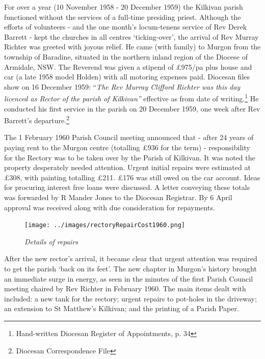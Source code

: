 For over a year (10 November 1958 - 20 December 1959) the Kilkivan parish functioned without the services of a full-time presiding priest. Although the efforts of volunteers - and the one month's locum-tenens service of Rev Derek Barrett - kept the churches in all centres `ticking-over', the arrival of Rev Murray Richter was greeted with joyous relief. He came (with family) to Murgon from the township of Baradine, situated in the northern inland region of the Diocese of Armidale, NSW. The Reverend was given a stipend of \pounds975/pa plus house and car (a late 1958 model Holden) with all motoring expenses paid. Diocesan files show on 16 December 1959: ``\emph{The Rev Murray Clifford Richter was this day licenced as Rector of the parish of Kilkivan''} effective as from date of writing.\footnote{Hand-written Diocesan Register of Appointments, p. 34} He conducted his first service in the parish on 20 December 1959, one week after Rev Barrett's departure.\footnote{Diocesan Correspondence File}


The 1 February 1960 Parish Council meeting announced that - after 24 years of paying rent to the Murgon centre (totalling \pounds936 for the term) - responsibility for the Rectory was to be taken over by the Parish of Kilkivan. It was noted the property desperately needed attention. Urgent initial repairs were estimated at \pounds308, with painting totalling \pounds211. \pounds176 was still owed on the car account. Ideas for procuring interest free loans were discussed. A letter conveying these totals was forwarded by R Mander Jones to the Diocesan Registrar. By 6 April approval was received along with due consideration for repayments.









\begin{figure}[!htb]
\begin{center}
\texttt{[image: ../images/rectoryRepairCost1960.png]}
\caption{\itshape Details of repairs}
\end{center}
\end{figure}




After the new rector's arrival, it became clear that urgent attention was required to get the parish `back on its feet'. The new chapter in Murgon's history brought an immediate surge in energy, as seen in the minutes of the first Parish Council meeting chaired by Rev Richter in February 1960. The main items dealt with included: a new tank for the rectory; urgent repairs to pot-holes in the driveway; an extension to St Matthew's Kilkivan; and the printing of a Parish Paper.



